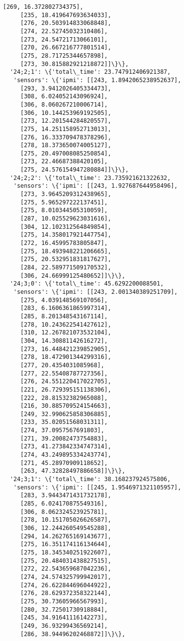 \documentclass[11pt]{article}
\begin{document}
\begin{tcolorbox}[breakable, size=fbox, boxrule=.5pt, pad at break*=1mm, opacityfill=0]
\begin{Verbatim}[commandchars=\\\{\}]
     [269, 16.372802734375],
     [235, 18.419647693634033],
     [276, 20.503914833068848],
     [274, 22.52745032310486],
     [273, 24.54721713066101],
     [270, 26.667216777801514],
     [275, 28.71725344657898],
     [273, 30.815882921218872]]\}\},
  '24;2;1': \{'total\_time': 23.747912406921387,
   'sensors': \{'ipmi': [[243, 1.8942065238952637],
     [293, 3.9412026405334473],
     [308, 6.024052143096924],
     [306, 8.060267210006714],
     [306, 10.144253969192505],
     [273, 12.201544284820557],
     [275, 14.251158952713013],
     [276, 16.333709478378296],
     [278, 18.373650074005127],
     [275, 20.497008085250854],
     [273, 22.46687388420105],
     [275, 24.576154947280884]]\}\},
  '24;2;2': \{'total\_time': 23.735921621322632,
   'sensors': \{'ipmi': [[243, 1.927687644958496],
     [273, 3.9645209312438965],
     [275, 5.965297222137451],
     [275, 8.010344505310059],
     [287, 10.025529623031616],
     [304, 12.102312564849854],
     [275, 14.358017921447754],
     [272, 16.45995783805847],
     [275, 18.493948221206665],
     [275, 20.532951831817627],
     [284, 22.589771509170532],
     [306, 24.66999125480652]]\}\},
  '24;3;0': \{'total\_time': 45.6292200088501,
   'sensors': \{'ipmi': [[243, 2.001340389251709],
     [275, 4.039148569107056],
     [283, 6.1606361865997314],
     [285, 8.201348543167114],
     [278, 10.243622541427612],
     [310, 12.267821073532104],
     [304, 14.30881142616272],
     [273, 16.448421239852905],
     [278, 18.472901344299316],
     [277, 20.4354031085968],
     [277, 22.55408787727356],
     [276, 24.551220417022705],
     [221, 26.729395151138306],
     [222, 28.81532382965088],
     [216, 30.885709524154663],
     [249, 32.990625858306885],
     [233, 35.02051568031311],
     [274, 37.0957567691803],
     [271, 39.20082473754883],
     [273, 41.273842334747314],
     [274, 43.249895334243774],
     [271, 45.28970909118652],
     [263, 47.32828497886658]]\}\},
  '24;3;1': \{'total\_time': 38.168237924575806,
   'sensors': \{'ipmi': [[245, 1.9546971321105957],
     [283, 3.9443471431732178],
     [285, 6.024170875549316],
     [306, 8.062324523925781],
     [278, 10.151705026626587],
     [306, 12.244260549545288],
     [294, 14.262765169143677],
     [275, 16.351174116134644],
     [275, 18.345340251922607],
     [275, 20.484031438827515],
     [272, 22.543659687042236],
     [274, 24.574325799942017],
     [274, 26.622844696044922],
     [276, 28.629372358322144],
     [275, 30.73605966567993],
     [280, 32.72501730918884],
     [245, 34.91641116142273],
     [249, 36.93299436569214],
     [286, 38.94496202468872]]\}\},

\end{Verbatim}
\end{tcolorbox}
\end{document}
